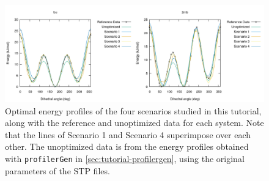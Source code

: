 \documentclass[10pt,a4paper]{report}
\numberwithin{equation}{section}
\newcommand{\profilergen}[0]{\texttt{profilerGen}}
\begin{document}
\begin{figure}[tb]
  \centering
  \includegraphics[width=\textwidth]{tutorial-profiles}
  \caption{Optimal energy profiles of the four scenarios studied in
    this tutorial, along with the reference and unoptimized data for
    each system.  Note that the lines of Scenario 1 and Scenario 4
    superimpose over each other.  The unoptimized data is from the
    energy profiles obtained with \profilergen{} in
    \autoref{sec:tutorial-profilergen}, using the original parameters
    of the STP files.}
  \label{fig:tutorial-profiles}
\end{figure}
\end{document}
